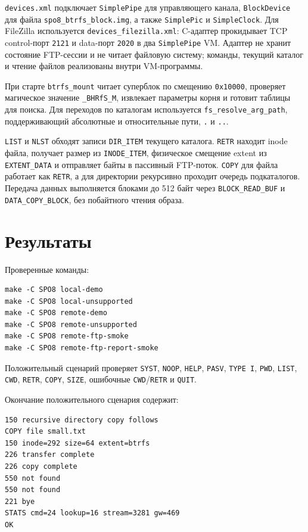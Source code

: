 \documentclass[a4paper,12pt]{article}
\begin{document}
\texttt{devices.xml} подключает \texttt{SimplePipe} для управляющего канала, \texttt{BlockDevice} для файла \texttt{spo8\_btrfs\_block.img}, а также \texttt{SimplePic} и \texttt{SimpleClock}. Для FileZilla используется \texttt{devices\_filezilla.xml}: C-адаптер прокидывает TCP control-порт \texttt{2121} и data-порт \texttt{2020} в два \texttt{SimplePipe} VM. Адаптер не хранит состояние FTP-сессии и не читает файловую систему; команды, текущий каталог и чтение файлов реализованы внутри VM-программы.

При старте \texttt{btrfs\_mount} читает суперблок по смещению \texttt{0x10000}, проверяет магическое значение \texttt{\_BHRfS\_M}, извлекает параметры корня и готовит таблицы для поиска. Для переходов по каталогам используется \texttt{fs\_resolve\_arg\_path}, поддерживающий абсолютные и относительные пути, \texttt{.} и \texttt{..}.

\texttt{LIST} и \texttt{NLST} обходят записи \texttt{DIR\_ITEM} текущего каталога. \texttt{RETR} находит inode файла, получает размер из \texttt{INODE\_ITEM}, физическое смещение extent из \texttt{EXTENT\_DATA} и отправляет байты в пассивный FTP-поток. \texttt{COPY} для файла работает как \texttt{RETR}, а для директории рекурсивно проходит очередь подкаталогов. Передача данных выполняется блоками до 512 байт через \texttt{BLOCK\_READ\_BUF} и \texttt{DATA\_COPY\_BLOCK}, без побайтного чтения образа.

\section{Результаты}
Проверенные команды:
\begin{lstlisting}
make -C SPO8 local-demo
make -C SPO8 local-unsupported
make -C SPO8 remote-demo
make -C SPO8 remote-unsupported
make -C SPO8 remote-ftp-smoke
make -C SPO8 remote-ftp-report-smoke
\end{lstlisting}

Положительный сценарий проверяет \texttt{SYST}, \texttt{NOOP}, \texttt{HELP}, \texttt{PASV}, \texttt{TYPE I}, \texttt{PWD}, \texttt{LIST}, \texttt{CWD}, \texttt{RETR}, \texttt{COPY}, \texttt{SIZE}, ошибочные \texttt{CWD}/\texttt{RETR} и \texttt{QUIT}.

Окончание положительного сценария содержит:
\begin{lstlisting}
150 recursive directory copy follows
COPY file small.txt
150 inode=292 size=64 extent=btrfs
226 transfer complete
226 copy complete
550 not found
550 not found
221 bye
STATS cmd=24 lookup=16 stream=3281 gw=469
OK
\end{lstlisting}
\end{document}
